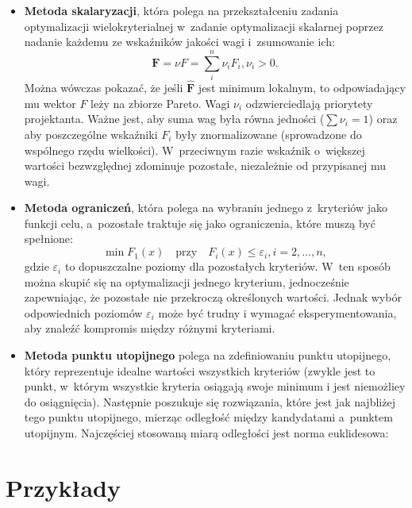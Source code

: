 \documentclass{article}
\begin{document}
    \begin{itemize}
        \item \textbf{Metoda skalaryzacji}, która polega na przekształceniu
        zadania optymalizacji wielokryterialnej w~zadanie optymalizacji
        skalarnej poprzez nadanie każdemu ze wskaźników jakości wagi i~zsumowanie ich:
        $$
            \mathbf{F} = \nu F = \sum_{i}^{n}\nu_{i}F_{i}, \nu_{i} > 0.
        $$
        Można wówczas pokazać, że jeśli $\hat{\textbf{F}}$ jest minimum lokalnym, to
        odpowiadający mu wektor $F$ leży na zbiorze Pareto.
        Wagi $\nu_{i}$ odzwierciedlają priorytety projektanta.
        Ważne jest, aby suma wag była równa jedności ($\sum\nu_{i} = 1$) oraz
        aby poszczególne wskaźniki $F_i$ były znormalizowane (sprowadzone
        do wspólnego rzędu wielkości). W~przeciwnym razie wskaźnik o~większej
        wartości bezwzględnej zdominuje pozostałe, niezależnie od przypisanej mu
        wagi.
        
        \item \textbf{Metoda ograniczeń}, która polega na wybraniu jednego
        z~kryteriów
        jako funkcji celu, a~pozostałe traktuje się jako ograniczenia, które muszą być spełnione:
        $$
            \min F_{1}(x) \quad \text{przy} \quad F_{i}(x) \leq \varepsilon_{i}, i = 2, \ldots, n,
        $$
        gdzie $\varepsilon_{i}$ to dopuszczalne poziomy dla pozostałych
        kryteriów. W~ten sposób
        można skupić się na optymalizacji jednego kryterium, jednocześnie
        zapewniając,
        że pozostałe nie przekroczą określonych wartości. Jednak wybór
        odpowiednich poziomów $\varepsilon_{i}$ może być trudny i wymagać
        eksperymentowania, aby znaleźć kompromis między różnymi kryteriami.

        \item \textbf{Metoda punktu utopijnego} polega na zdefiniowaniu
        punktu utopijnego, który reprezentuje idealne wartości wszystkich
        kryteriów (zwykle jest to punkt, w~którym wszystkie kryteria osiągają
        swoje minimum i jest niemożliey do osiągnięcia). Następnie poszukuje
        się rozwiązania, które jest jak najbliżej tego punktu utopijnego,
        mierząc odległość między kandydatami a~punktem utopijnym. Najczęściej
        stosowaną miarą odległości jest norma euklidesowa:
    \end{itemize} 

\section{Przykłady}
\end{document}
